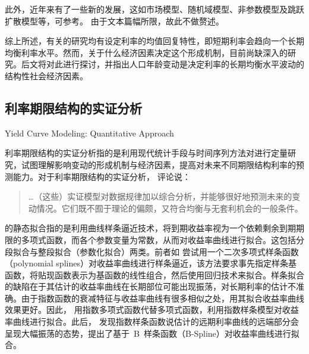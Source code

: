 此外，近年来\tsm 有了一些新的发展，这如市场模型、随机域模型、非参数模型及跳跃扩散模型等，可参考。 由于文本篇幅所限，故此不做赘述。

综上所述，有关\ts 的研究均有设定利率的均值回复特性，即短期利率会趋向一个长期均衡利率水平。然而，关于什么经济因素决定这个形成机制，目前尚缺深入的研究。后文将对此进行探讨，并指出人口年龄变动是决定利率的长期均衡水平波动的结构性社会经济因素。

\subsection{利率期限结构的实证分析}{Yield Curve Modeling: Quantitative Approach}

利率期限结构的实证分析指的是利用现代统计手段与时间序列方法对\ts 进行定量研究，试图理解影响\tsm 变动的形成机制与经济因素，提高对未来不同期限结构利率的预测能力。对于利率期限结构的实证分析， 评论说：
\begin{quotation}
  \ldots{}（这些）实证模型对数据规律加以综合分析，并能够很好地预测未来\yc 的变动情况。它们既不囿于理论的偏颇，又符合均衡与无套利机会的一般条件。
\end{quotation}

\tsm 的静态拟合指的是利用曲线样条逼近技术，将到期收益率视为一个依赖剩余到期期限的多项式函数，而各个参数变量为常数，从而对收益率曲线进行拟合。这包括分段拟合与整段拟合（参数化拟合）两类。前者如 尝试用一个二次多项式样条函数（polynomial splines）对收益率曲线进行样条逼近，该方法要求事先指定样条基函数，将贴现函数表示为基函数的线性组合，然后使用回归技术来拟合。样条拟合的缺陷在于其估计的收益率曲线在长期部位可能出现振荡，对长期利率的估计不准确。由于指数函数的衰减特征与收益率曲线有很多相似之处，用其拟合收益率曲线效果更好。因此， 用指数多项式函数代替多项式函数，利用指数样条模型对收益率曲线进行拟合。此后， 发现指数样条函数说估计的远期利率曲线的远端部分会呈现大幅振荡的态势，提出了基于~B~样条函数（B-Spline）对收益率曲线进行拟合。

